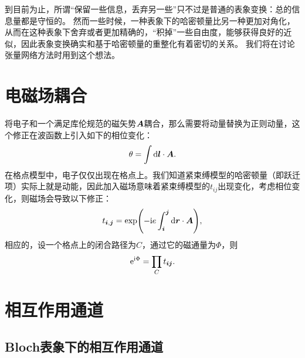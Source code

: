 到目前为止，所谓“保留一些信息，丢弃另一些”只不过是普通的表象变换：总的信息量都是守恒的。
然而一些时候，一种表象下的哈密顿量比另一种更加对角化，从而在这种表象下舍弃或者更加精确的，“积掉”一些自由度，能够获得良好的近似，因此表象变换确实和基于哈密顿量的重整化有着密切的关系。
我们将在讨论张量网络方法时用到这个想法。

\section{电磁场耦合}


将电子和一个满足库伦规范的磁矢势$\vb*{A}$耦合，那么需要将动量替换为正则动量，这个修正在波函数上引入如下的相位变化：
\begin{equation}
    \theta = \int \dd{\vb*{l}} \cdot \vb*{A}.
\end{equation}
在格点模型中，电子仅仅出现在格点上。我们知道紧束缚模型的哈密顿量（即跃迁项）实际上就是动能，因此加入磁场意味着紧束缚模型的$t_{ij}$出现变化，考虑相位变化，则磁场会导致以下修正：
\begin{equation}
    t_{\vb*{i}, \vb*{j}} = \exp(- \mathrm{i} e \int_{\vb*{i}}^{\vb*{j}} \dd{\vb*{r}} \cdot \vb*{A}),
\end{equation}
相应的，设一个格点上的闭合路径为$C$，通过它的磁通量为$\Phi$，则
\begin{equation}
    \mathrm{e}^{\mathrm{i} \Phi} = \prod_{C} t_{\vb*{i} \vb*{j}}.
\end{equation}

\section{相互作用通道}

\subsection{Bloch表象下的相互作用通道}\label{sec:interaction-bloch}

